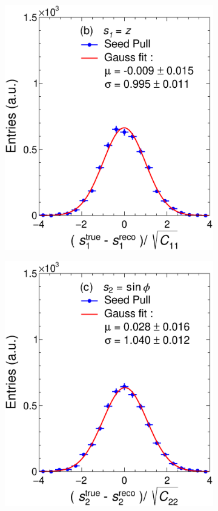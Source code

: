 \begin{figure}[t]
\begin{subfigure}{0.32\textwidth}
         \includegraphics[width=\textwidth]{figures/ch4-KF_NDGArLite/Toy/NoCorr/UnitSeed_p1.eps}
         \caption{}
         \label{fig:resp1Seed_GArLite_NoCorr}
     \end{subfigure}
    \begin{subfigure}{0.32\textwidth}
         \centering
         \includegraphics[width=\textwidth]{figures/ch4-KF_NDGArLite/Toy/NoCorr/UnitSeed_p2.eps}

\end{subfigure}
\end{figure}
